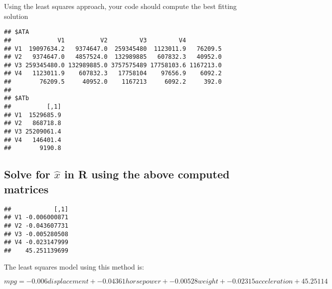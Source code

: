 \documentclass[]{article}
\newenvironment{Shaded}{\begin{snugshade}}{\end{snugshade}}
\newcommand{\KeywordTok}[1]{\textcolor[rgb]{0.13,0.29,0.53}{\textbf{{#1}}}}
\newcommand{\StringTok}[1]{\textcolor[rgb]{0.31,0.60,0.02}{{#1}}}
\newcommand{\NormalTok}[1]{{#1}}
\begin{document}
Using the least squares approach, your code should compute the best
fitting solution

\begin{Shaded}
\end{Shaded}

\begin{verbatim}
## $ATA
##             V1          V2         V3         V4          
## V1  19097634.2   9374647.0  259345480  1123011.9   76209.5
## V2   9374647.0   4857524.0  132989885   607832.3   40952.0
## V3 259345480.0 132989885.0 3757575489 17758103.6 1167213.0
## V4   1123011.9    607832.3   17758104    97656.9    6092.2
##        76209.5     40952.0    1167213     6092.2     392.0
## 
## $ATb
##          [,1]
## V1  1529685.9
## V2   868718.8
## V3 25209061.4
## V4   146401.4
##        9190.8
\end{verbatim}

\subsection{\texorpdfstring{Solve for \(\hat{x}\) in R using the above
computed
matrices}{Solve for \textbackslash{}hat\{x\} in R using the above computed matrices}}\label{solve-for-hatx-in-r-using-the-above-computed-matrices-1}

\begin{Shaded}
\end{Shaded}

\begin{verbatim}
##            [,1]
## V1 -0.006000871
## V2 -0.043607731
## V3 -0.005280508
## V4 -0.023147999
##    45.251139699
\end{verbatim}

The least squares model using this method is:

\[mpg = -0.006displacement + -0.04361horsepower + -0.00528weight + -0.02315acceleration 
 + 45.25114\]
\end{document}
